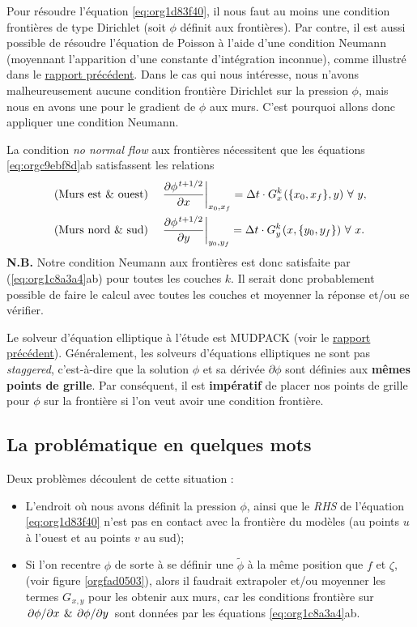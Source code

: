 \documentclass[10pt]{article}
\numberwithin{equation}{section}
\newcommand{\pt}{\hspace{1pt}} %
\begin{document}
Pour résoudre l'équation \ref{eq:org1d83f40}, il nous faut au moins une condition frontières de type Dirichlet (soit \(\phi\) définit aux frontières).
Par contre, il est aussi possible de résoudre l'équation de Poisson à l'aide d'une condition Neumann (moyennant l'apparition d'une constante d'intégration inconnue), comme illustré dans le \href{rapport-2023-04-21.org}{rapport précédent}.
Dans le cas qui nous intéresse, nous n'avons malheureusement aucune condition frontière Dirichlet sur la pression \(\phi\), mais nous en avons une pour le gradient de \(\phi\) aux murs.
C'est pourquoi allons donc appliquer une condition Neumann.\bigskip

La condition \emph{no normal flow} aux frontières nécessitent que les équations \ref{eq:orgc9ebf8d}ab satisfassent les relations
\begin{subequations}
\label{eq:org1c8a3a4}
\begin{align}
&& &\text{(Murs est \& ouest)}
&&\eval{\pdv{\phi^{\pt t+1/2}}{x}}_{x_0,x_f} =  \Delta t\cdot G^k_x\pt (\{x_0,x_f\},y)\ \forall\ y,&&\\
&& &\text{(Murs nord \& sud)}
&&\eval{\pdv{\phi^{\pt t+1/2}}{y}}_{y_0,y_f} =  \Delta t\cdot G^k_y\pt (x,\{y_0,y_f\})\ \forall\ x.&&
\end{align}
\end{subequations}
\textbf{N.B.} Notre condition Neumann aux frontières est donc satisfaite par (\ref{eq:org1c8a3a4}ab) pour toutes les couches \(k\).
Il serait donc probablement possible de faire le calcul avec toutes les couches et moyenner la réponse et/ou se vérifier.\bigskip

Le solveur d'équation elliptique à l'étude est MUDPACK (voir le \href{rapport-2023-04-21.org}{rapport précédent}).
Généralement, les solveurs d'équations elliptiques ne sont pas \emph{staggered}, c'est-à-dire que la solution \(\phi\) et sa dérivée \(\partial\phi\) sont définies aux \textbf{mêmes points de grille}.
Par conséquent, il est \textbf{impératif} de placer nos points de grille pour \(\phi\) sur la frontière si l'on veut avoir une condition frontière.

\subsection{La problématique en quelques mots}
\label{sec:orgb25e3cd}

Deux problèmes découlent de cette situation :
\begin{itemize}
\item L'endroit où nous avons définit la pression \(\phi\), ainsi que le \emph{RHS} de l'équation \ref{eq:org1d83f40} n'est pas en contact avec la frontière du modèles (au points \(u\) à l'ouest et au points \(v\) au sud);
\item Si l'on recentre \(\phi\) de sorte à se définir une \(\tilde{\phi}\) à la même position que \(f\) et \(\zeta\), (voir figure \ref{orgfad0503}), alors il faudrait extrapoler et/ou moyenner les termes \(G_{\pt x,y}\) pour les obtenir aux murs, car les conditions frontière sur \(\pdv*{\phi}{x}\pt \& \pt \pdv*{\phi}{y}\) sont données par les équations \ref{eq:org1c8a3a4}ab.
\end{itemize}
\end{document}
